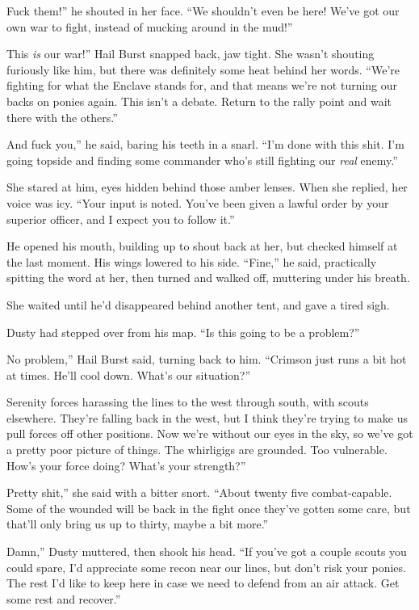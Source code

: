 \leavevmode{}Fuck them!” he shouted in her face. “We shouldn’t even be here! We’ve got our own war to fight, instead of mucking around in the mud!”

\leavevmode{}This \textit{is} our war!” Hail Burst snapped back, jaw tight. She wasn’t shouting furiously like him, but there was definitely some heat behind her words. “We’re fighting for what the Enclave stands for, and that means we’re not turning our backs on ponies again. This isn’t a debate. Return to the rally point and wait there with the others.”

\leavevmode{}And fuck you,” he said, baring his teeth in a snarl. “I’m done with this shit. I’m going topside and finding some commander who’s still fighting our \textit{real} enemy.”

She stared at him, eyes hidden behind those amber lenses. When she replied, her voice was icy. “Your input is noted. You’ve been given a lawful order by your superior officer, and I expect you to follow it.”

He opened his mouth, building up to shout back at her, but checked himself at the last moment. His wings lowered to his side. “Fine,” he said, practically spitting the word at her, then turned and walked off, muttering under his breath.

She waited until he’d disappeared behind another tent, and gave a tired sigh.

Dusty had stepped over from his map. “Is this going to be a problem?”

\leavevmode{}No problem,” Hail Burst said, turning back to him. “Crimson just runs a bit hot at times. He’ll cool down. What’s our situation?”

\leavevmode{}Serenity forces harassing the lines to the west through south, with scouts elsewhere. They’re falling back in the west, but I think they’re trying to make us pull forces off other positions. Now we’re without our eyes in the sky, so we’ve got a pretty poor picture of things. The whirligigs are grounded. Too vulnerable. How’s your force doing? What’s your strength?”

\leavevmode{}Pretty shit,” she said with a bitter snort. “About twenty five combat-capable. Some of the wounded will be back in the fight once they’ve gotten some care, but that’ll only bring us up to thirty, maybe a bit more.”

\leavevmode{}Damn,” Dusty muttered, then shook his head. “If you’ve got a couple scouts you could spare, I’d appreciate some recon near our lines, but don’t risk your ponies. The rest I’d like to keep here in case we need to defend from an air attack. Get some rest and recover.”

